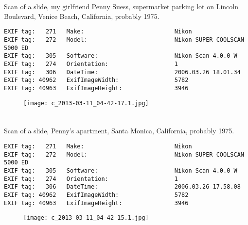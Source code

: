 \section{\protect{}}
\noindent Scan of a slide, my girlfriend Penny Suess, supermarket parking lot on Lincoln Boulevard, Venice Beach, California, probably 1975.
\noindent
\begin{lstlisting}
EXIF tag:   271   Make:                          Nikon
EXIF tag:   272   Model:                         Nikon SUPER COOLSCAN 5000 ED
EXIF tag:   305   Software:                      Nikon Scan 4.0.0 W
EXIF tag:   274   Orientation:                   1
EXIF tag:   306   DateTime:                      2006.03.26 18.01.34
EXIF tag: 40962   ExifImageWidth:                5782
EXIF tag: 40963   ExifImageHeight:               3946

\end{lstlisting}
\clearpage
\begin{figure}
\raggedleft
\texttt{[image: c\_2013-03-11\_04-42-17.1.jpg]}
\end{figure}


\clearpage
\section{\protect{}}
\noindent Scan of a slide, Penny's apartment, Santa Monica, California, probably 1975.
\noindent
\begin{lstlisting}
EXIF tag:   271   Make:                          Nikon
EXIF tag:   272   Model:                         Nikon SUPER COOLSCAN 5000 ED
EXIF tag:   305   Software:                      Nikon Scan 4.0.0 W
EXIF tag:   274   Orientation:                   1
EXIF tag:   306   DateTime:                      2006.03.26 17.58.08
EXIF tag: 40962   ExifImageWidth:                5782
EXIF tag: 40963   ExifImageHeight:               3946

\end{lstlisting}
\clearpage
\begin{figure}
\raggedleft
\texttt{[image: c\_2013-03-11\_04-42-15.1.jpg]}
\end{figure}


\clearpage
